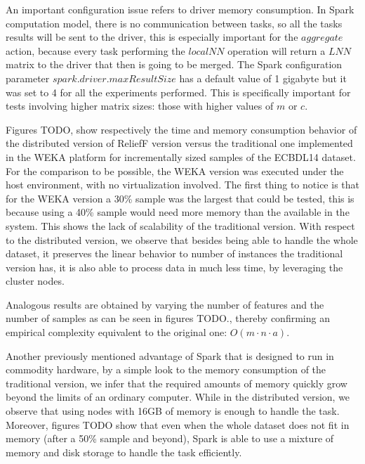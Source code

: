 An important configuration issue refers to driver memory consumption. In Spark computation model, there is no communication between tasks, so all the tasks results will be sent to the driver, this is especially important for the $aggregate$ action, because every task performing the $localNN$ operation will return a $LNN$ matrix to the driver that then is going to be merged. The Spark configuration parameter $spark.driver.maxResultSize$ has a default value of 1 gigabyte but it was set to 4 for all the experiments performed. This is specifically important for tests involving higher matrix sizes: those with higher values of $m$ or $c$.

Figures {TODO}, show respectively the time and memory consumption behavior of the distributed version of ReliefF version versus the traditional one implemented in the WEKA\cite{Hall2009} platform for incrementally sized samples of the ECBDL14 dataset. For the comparison to be possible, the WEKA version was executed under the host environment, with no virtualization involved. The first thing to notice is that for the WEKA version a 30\% sample was the largest that could be tested, this is because using a 40\% sample would need more memory than the available in the system. This shows the lack of scalability of the traditional version. With respect to the distributed version, we observe that besides being able to handle the whole dataset, it preserves the linear behavior to number of instances the traditional version has, it is also able to process data in much less time, by leveraging the cluster nodes. 

Analogous results are obtained by varying the number of features and the number of samples as can be seen in figures {TODO.}, thereby confirming an empirical complexity equivalent to the original one: $O(m \cdot n \cdot a)$.

Another previously mentioned advantage of Spark that is designed to run in commodity hardware, by a simple look to the memory consumption of the traditional version, we infer that the required amounts of memory quickly grow beyond the limits of an ordinary computer. While in the distributed version, we observe that using nodes with 16GB of memory is enough to handle the task. Moreover, figures {TODO} show that even when the whole dataset does not fit in memory (after a 50\% sample and beyond), Spark is able to use a mixture of memory and disk storage to handle the task efficiently. 



